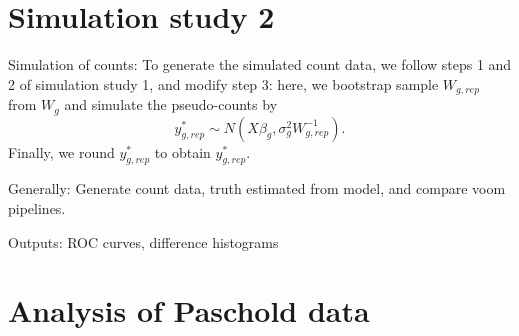 \section{Simulation study 2}
Simulation of counts:
To generate the simulated count data, we follow steps 1 and 2 of simulation study 1, and modify step 3: here, we bootstrap sample $W_{g,rep}$ from $W_g$ and simulate the pseudo-counts by
$$y^*_{g,rep} \sim N(X\beta_g,\sigma^2_gW_{g,rep}^{-1}).$$
Finally, we round $y^*_{g,rep}$ to obtain $y^*_{g,rep}$.

Generally: Generate count data, truth estimated from model, and compare voom pipelines.

Outputs: ROC curves, difference histograms

\section{Analysis of Paschold data}




